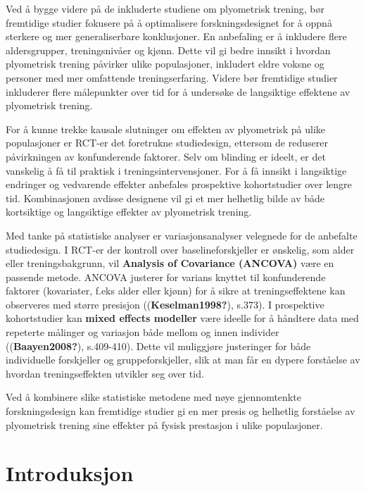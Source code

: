 \documentclass[
  letterpaper,
  DIV=11,
  numbers=noendperiod]{scrreprt}
\begin{document}
Ved å bygge videre på de inkluderte studiene om plyometrisk trening, bør
fremtidige studier fokusere på å optimalisere forskningsdesignet for å
oppnå sterkere og mer generaliserbare konklusjoner. En anbefaling er å
inkludere flere aldersgrupper, treningsnivåer og kjønn. Dette vil gi
bedre innsikt i hvordan plyometrisk trening påvirker ulike populasjoner,
inkludert eldre voksne og personer med mer omfattende treningserfaring.
Videre bør fremtidige studier inkluderer flere målepunkter over tid for
å undersøke de langsiktige effektene av plyometrisk trening.

For å kunne trekke kausale slutninger om effekten av plyometrisk på
ulike populasjoner er RCT-er det foretrukne studiedesign, ettersom de
reduserer påvirkningen av konfunderende faktorer. Selv om blinding er
ideelt, er det vanskelig å få til praktisk i treningsintervensjoner. For
å få innsikt i langsiktige endringer og vedvarende effekter anbefales
prospektive kohortstudier over lengre tid. Kombinasjonen avdisse
designene vil gi et mer helhetlig bilde av både kortsiktige og
langsiktige effekter av plyometrisk trening.

Med tanke på statistiske analyser er variasjonsanalyser velegnede for de
anbefalte studiedesign. I RCT-er der kontroll over baselineforskjeller
er ønskelig, som alder eller treningsbakgrunn, vil \textbf{Analysis of
Covariance (ANCOVA)} være en passende metode. ANCOVA justerer for
varians knyttet til konfunderende faktorer (kovariater, f.eks alder
eller kjønn) for å sikre at treningseffektene kan observeres med større
presisjon ((\textbf{Keselman1998?}), s.373). I prospektive kohortstudier
kan \textbf{mixed effects modeller} være ideelle for å håndtere data med
repeterte målinger og variasjon både mellom og innen individer
((\textbf{Baayen2008?}), s.409-410). Dette vil muliggjøre justeringer
for både individuelle forskjeller og gruppeforskjeller, slik at man får
en dypere forståelse av hvordan treningseffekten utvikler seg over tid.

Ved å kombinere slike statistiske metodene med nøye gjennomtenkte
forskningsdesign kan fremtidige studier gi en mer presis og helhetlig
forståelse av plyometrisk trening sine effekter på fysisk prestasjon i
ulike populasjoner.


\chapter{Introduksjon}\label{introduksjon-5}
\end{document}
